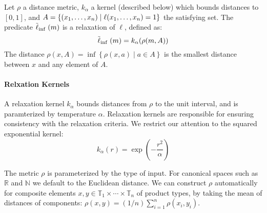 \begin{definition}
Let $\rho$ a distance metric, $k_\alpha$ a kernel (described below) which bounds distances to $[0, 1]$, and $A = \{(x_1, \dots, x_n) \mid \operatorname{\ell}(x_1, \dots, x_n) = 1\}$ the satisfying set.
The predicate $\mathrel{\tilde{\operatorname{\ell}}}_{\inf}(m)$ is a relaxation of $\ell$, defined as:
\begin{equation}
\mathrel{\tilde{\operatorname{\ell}}}_{\inf}(m) = k_\alpha(\rho(m, A))
\end{equation}
The distance $\rho(x, A) = \inf \left\{\rho(x, a) \mid a \in A\right\}$ is the smallest distance between $x$ and any element of $A$.
\end{definition}

\paragraph{Relxation Kernels} A relaxation kernel $k_\alpha$ bounds distances from $\rho$ to the unit interval, and is paramterized by temperature $\alpha$.
Relaxation kernels are responsible for ensuring consistency with the relaxation criteria.
We restrict our attention to the squared exponential kernel:
\begin{equation}
k_{\alpha}(r) = \exp\left(-\frac{r^2}{\alpha}\right)
\end{equation}

The metric $\rho$ is parameterized by the type of input.
For canonical spaces such as $\mathbb{R}$ and $\mathbb{N}$ we default to the Euclidean distance. 
We can construct $\rho$ automatically for composite elements $x, y \in \mathbb{T}_1 \times \cdots \times \mathbb{T}_n$ of product types, by taking the mean of distances of components: $\rho(x, y) = (1/n)\sum^n_{i=1}\rho(x_i, y_i)$.






